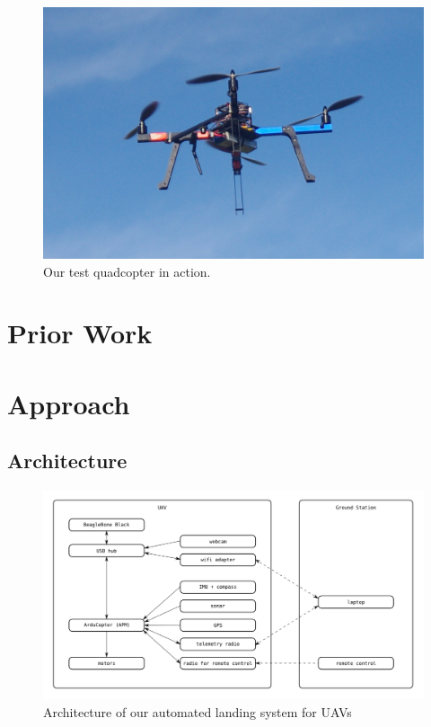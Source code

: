 \documentclass[10pt]{scrartcl} %
\begin{document}
\begin{figure}[h]
    \centering
    \includegraphics[width=\textwidth]{images/drone.jpg}
    \caption{Our test quadcopter in action.}
    \label{fig:drone}
\end{figure}


\section{Prior Work}

\section{Approach}

\subsection{Architecture}

\begin{figure}[h]
    \centering
    \includegraphics[width=\textwidth]{images/architecture.png}
    \caption{Architecture of our automated landing system for UAVs}
    \label{fig:architecture}
\end{figure}
\end{document}
